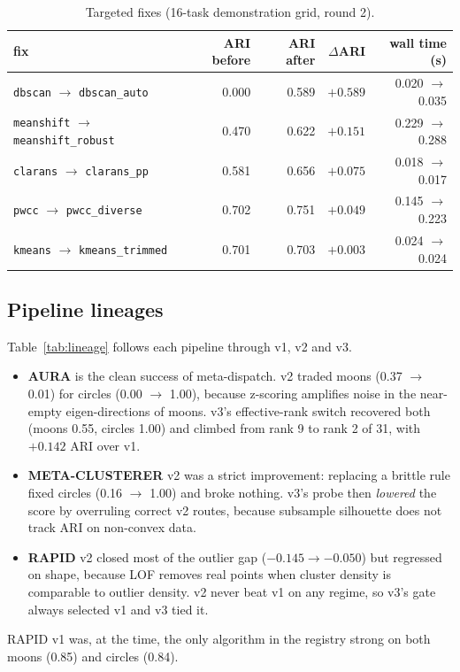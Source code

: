 \documentclass[11pt,a4paper]{article}
\newcommand{\code}[1]{\texttt{#1}}
\begin{document}
\begin{table}[t]
  \centering\small
  \caption{Targeted fixes (16-task demonstration grid, round 2).}
  \label{tab:fixes}
  \begin{tabular}{lrrrr}
    \toprule
    fix & ARI before & ARI after & $\Delta$ARI & wall time (s) \\
    \midrule
    \code{dbscan} $\to$ \code{dbscan\_auto} & 0.000 & 0.589 & $+0.589$ & 0.020 $\to$ 0.035 \\
    \code{meanshift} $\to$ \code{meanshift\_robust} & 0.470 & 0.622 & $+0.151$ & 0.229 $\to$ 0.288 \\
    \code{clarans} $\to$ \code{clarans\_pp} & 0.581 & 0.656 & $+0.075$ & 0.018 $\to$ 0.017 \\
    \code{pwcc} $\to$ \code{pwcc\_diverse} & 0.702 & 0.751 & $+0.049$ & 0.145 $\to$ 0.223 \\
    \code{kmeans} $\to$ \code{kmeans\_trimmed} & 0.701 & 0.703 & $+0.003$ & 0.024 $\to$ 0.024 \\
    \bottomrule
  \end{tabular}
\end{table}

\subsection{Pipeline lineages}
Table~\ref{tab:lineage} follows each pipeline through v1, v2 and v3.
\begin{itemize}
  \item \textbf{AURA} is the clean success of meta-dispatch. v2 traded moons
  (0.37 $\to$ 0.01) for circles (0.00 $\to$ 1.00), because z-scoring amplifies
  noise in the near-empty eigen-directions of moons. v3's effective-rank switch
  recovered both (moons 0.55, circles 1.00) and climbed from rank 9 to rank 2
  of 31, with $+0.142$ ARI over v1.
  \item \textbf{META-CLUSTERER} v2 was a strict improvement: replacing a
  brittle rule fixed circles (0.16 $\to$ 1.00) and broke nothing. v3's probe
  then \emph{lowered} the score by overruling correct v2 routes, because
  subsample silhouette does not track ARI on non-convex data.
  \item \textbf{RAPID} v2 closed most of the outlier gap ($-0.145 \to -0.050$)
  but regressed on shape, because LOF removes real points when cluster density
  is comparable to outlier density. v2 never beat v1 on any regime, so v3's
  gate always selected v1 and v3 tied it.
\end{itemize}
RAPID v1 was, at the time, the only algorithm in the registry strong on both
moons (0.85) and circles (0.84).
\end{document}

